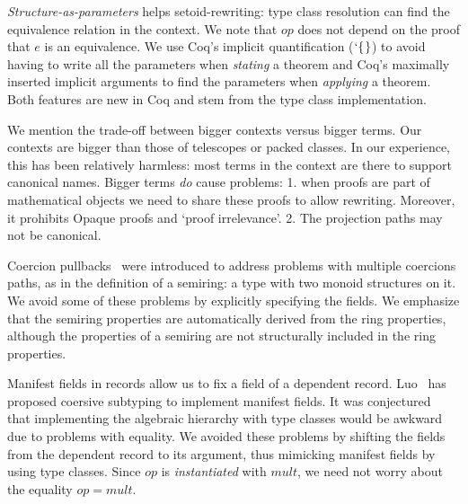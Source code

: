 \documentclass{llncs}
\newcommand{\Varid}[1]{\mathit{#1}}
\begin{document}
\emph{Structure-as-parameters} helps setoid-rewriting: type class resolution
can find the equivalence relation in the context.
We note that \ensuremath{\Varid{op}} does not depend on the proof that \ensuremath{\Varid{e}} is an equivalence. We use Coq's implicit
quantification (\ensuremath{\hspace*{0mm}`\hspace*{0mm}\{\mskip1.5mu\}}) to avoid having to write all the parameters when \emph{stating} a theorem
and Coq's maximally inserted implicit arguments to find the parameters when \emph{applying} a
theorem. Both features are new in Coq and stem from the type class implementation.

We mention the trade-off between bigger contexts versus bigger terms. Our contexts are bigger than
those of telescopes or packed classes. In our experience, this has been relatively harmless: most
terms in the context are there to support canonical names. Bigger terms
\emph{do} cause problems: 1. when proofs are part of mathematical objects we need to share these
proofs to allow rewriting. Moreover, it prohibits Opaque proofs and `proof irrelevance'. 2. The
projection paths may not be canonical.

Coercion pullbacks~\cite{Hints} were introduced to address problems with multiple coercions paths,
as in the definition of a semiring: a type with two monoid structures on it. We avoid some
of these problems by explicitly specifying the fields. We emphasize that the semiring properties are automatically derived from the ring
properties, although the properties of a semiring are not structurally included in the ring
properties.

Manifest fields in records allow us to fix a field of a dependent record.
Luo~\cite{DBLP:conf/types/Luo08} has proposed coersive subtyping to implement manifest fields.
It was conjectured~\cite{Hints} that implementing the algebraic hierarchy with type classes would
be awkward due to problems with equality. We avoided these problems by shifting the fields
from the dependent record to its argument, thus mimicking manifest fields by using type classes.
Since \ensuremath{\Varid{op}} is \emph{instantiated} with \ensuremath{\Varid{mult}}, we need not worry about the
equality \ensuremath{\Varid{op=mult}}.
\end{document}
